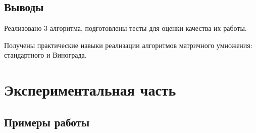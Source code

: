 \documentclass[a4paper,14pt]{article} %
\begin{document}
	\subsection{Выводы}
	\hfill
	
	Реализовано 3 алгоритма, подготовлены тесты для оценки качества их работы. 
        
        Получены практические навыки реализации алгоритмов матричного умножения: стандартного и Винограда. 
	
        \hfill
        
        
        \newpage

        \section{Экспериментальная часть}
       
        
        \subsection{Примеры работы}
	\hfill
	
\end{document}
